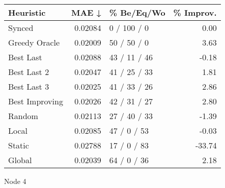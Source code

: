 \begin{tabular}{lrlr}
\toprule
\textbf{Heuristic} & \textbf{MAE ↓} & \textbf{\% Be/Eq/Wo} & \textbf{\% Improv.} \\
\midrule
            Synced &        0.02084 &          0 / 100 / 0 &                0.00 \\
     Greedy Oracle &        0.02009 &          50 / 50 / 0 &                3.63 \\
         Best Last &        0.02088 &         43 / 11 / 46 &               -0.18 \\
       Best Last 2 &        0.02047 &         41 / 25 / 33 &                1.81 \\
       Best Last 3 &        0.02025 &         41 / 33 / 26 &                2.86 \\
    Best Improving &        0.02026 &         42 / 31 / 27 &                2.80 \\
            Random &        0.02113 &         27 / 40 / 33 &               -1.39 \\
             Local &        0.02085 &          47 / 0 / 53 &               -0.03 \\
            Static &        0.02788 &          17 / 0 / 83 &              -33.74 \\
            Global &        0.02039 &          64 / 0 / 36 &                2.18 \\
\bottomrule
\end{tabular}
\caption{Node 4}
\label{tab:iid_lr01_le2_bs2_4}
